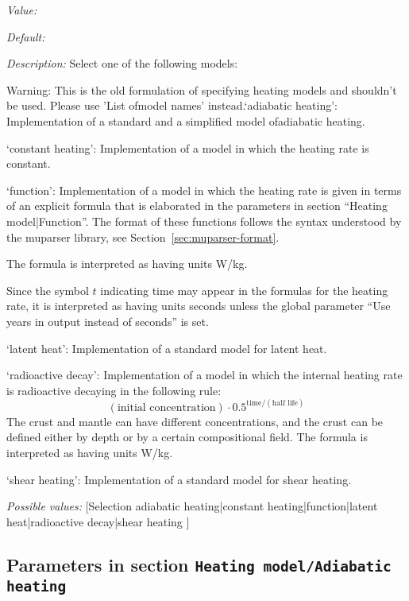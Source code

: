 \begin{itemize}
{\it Value:} 


{\it Default:} 


{\it Description:} Select one of the following models:

Warning: This is the old formulation of specifying heating models and shouldn't be used. Please use 'List ofmodel names' instead.`adiabatic heating': Implementation of a standard and a simplified model ofadiabatic heating.

`constant heating': Implementation of a model in which the heating rate is constant.

`function': Implementation of a model in which the heating rate is given in terms of an explicit formula that is elaborated in the parameters in section ``Heating model|Function''. The format of these functions follows the syntax understood by the muparser library, see Section~\ref{sec:muparser-format}.

The formula is interpreted as having units W/kg.

Since the symbol $t$ indicating time may appear in the formulas for the heating rate, it is interpreted as having units seconds unless the global parameter ``Use years in output instead of seconds'' is set.

`latent heat': Implementation of a standard model for latent heat.

`radioactive decay': Implementation of a model in which the internal heating rate is radioactive decaying in the following rule:
\[(\text{initial concentration})\cdot 0.5^{\text{time}/(\text{half life})}\]
The crust and mantle can have different concentrations, and the crust can be defined either by depth or by a certain compositional field.
The formula is interpreted as having units W/kg.

`shear heating': Implementation of a standard model for shear heating.


{\it Possible values:} [Selection adiabatic heating|constant heating|function|latent heat|radioactive decay|shear heating ]
\end{itemize}



\subsection{Parameters in section \tt Heating model/Adiabatic heating}
\label{parameters:Heating_20model/Adiabatic_20heating}

